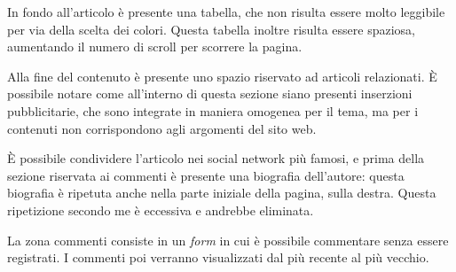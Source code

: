 In fondo all'articolo è presente una tabella, che non risulta essere molto
leggibile per via della scelta dei colori. Questa tabella inoltre risulta essere
spaziosa, aumentando il numero di scroll per scorrere la pagina.

Alla fine del contenuto è presente uno spazio riservato ad articoli relazionati.
È possibile notare come all'interno di questa sezione siano presenti inserzioni
pubblicitarie, che sono integrate in maniera omogenea per il tema, ma per i
contenuti non corrispondono agli argomenti del sito web.

È possibile condividere l'articolo nei social network più famosi, e prima della
sezione riservata ai commenti è presente una biografia dell'autore: questa
biografia è ripetuta anche nella parte iniziale della pagina, sulla destra.
Questa ripetizione secondo me è eccessiva e andrebbe eliminata.

La zona commenti consiste in un \textit{form} in cui è possibile commentare
senza essere registrati. I commenti poi verranno visualizzati dal più recente
al più vecchio.
